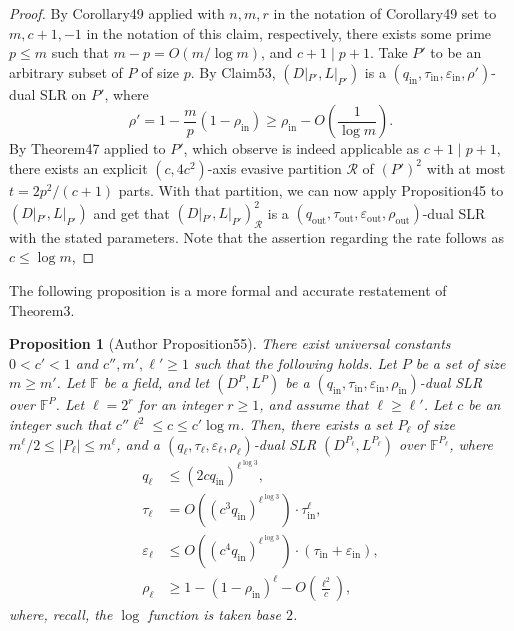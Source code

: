 \documentclass[10pt,a4paper]{article}
\newtheorem{ntproposition}[nttheorem]{Proposition}
\begin{document}
\begin{proof}
By Corollary49 applied with $n,m,r$ in the notation of Corollary49 set to $m,c+1,-1$ in the notation of this claim, respectively, there exists some prime $p\leq m$ such that $m-p=O(m/\log m)$, and $c+1\mid p+1$. Take $P'$ to be an arbitrary subset of $P$ of size $p$. By Claim53, $(D|_{P'},L|_{P'})$ is a $(q_{\mathrm{in}},\tau_{\mathrm{in}},\varepsilon_{\mathrm{in}},\rho')$-dual SLR on $P'$, where
\[\rho'=1-\frac mp(1-\rho_{\mathrm{in}})\geq\rho_{\mathrm{in}}-O\left(\frac1{\log m}\right).\]
By Theorem47 applied to $P'$, which observe is indeed applicable as $c+1\mid p+1$, there exists an explicit $(c,4c^2)$-axis evasive partition $\mathcal R$ of $(P')^2$ with at most $t=2p^2/(c+1)$ parts. With that partition, we can now apply Proposition45 to $(D|_{P'},L|_{P'})$ and get that $(D|_{P'},L|_{P'})^2_{\mathcal R}$ is a $(q_{\mathrm{out}},\tau_{\mathrm{out}},\varepsilon_{\mathrm{out}},\rho_{\mathrm{out}})$-dual SLR with the stated parameters. Note that the assertion regarding the rate follows as $c\leq\log m$,
\end{proof}
The following proposition is a more formal and accurate restatement of Theorem3.
\begin{ntproposition}[Author Proposition55]
There exist universal constants $0<c'<1$ and $c'',m',\ell'\geq1$ such that the following holds. Let $P$ be a set of size $m\geq m'$. Let $\mathbb F$ be a field, and let $(D^P,L^P)$ be a $(q_{\mathrm{in}},\tau_{\mathrm{in}},\varepsilon_{\mathrm{in}},\rho_{\mathrm{in}})$-dual SLR over $\mathbb F^P$. Let $\ell=2^r$ for an integer $r\geq1$, and assume that $\ell\geq\ell'$. Let $c$ be an integer such that $c''\ell^2\leq c\leq c'\log m$. Then, there exists a set $P_\ell$ of size $m^\ell/2\leq|P_\ell|\leq m^\ell$, and a $(q_\ell,\tau_\ell,\varepsilon_\ell,\rho_\ell)$-dual SLR $(D^{P_\ell},L^{P_\ell})$ over $\mathbb F^{P_\ell}$, where
\begin{align*}q_\ell&\leq(2cq_{\mathrm{in}})^{\ell^{\log3}},\\\tau_\ell&=O((c^3q_{\mathrm{in}})^{\ell^{\log3}})\cdot\tau_{\mathrm{in}}^\ell,\\\varepsilon_\ell&\leq O((c^4q_{\mathrm{in}})^{\ell^{\log3}})\cdot(\tau_{\mathrm{in}}+\varepsilon_{\mathrm{in}}),\\\rho_\ell&\geq1-(1-\rho_{\mathrm{in}})^\ell-O\left(\frac{\ell^2}c\right),\end{align*}
where, recall, the $\log$ function is taken base $2$.
\end{ntproposition}
\end{document}
